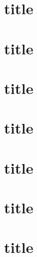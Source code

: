 \documentclass[twoside]{fduthesis}
\begin{document}
\section{title}
\section{title}
\section{title}
\section{title}
\section{title}
\section{title}
\section{title}
\end{document}
